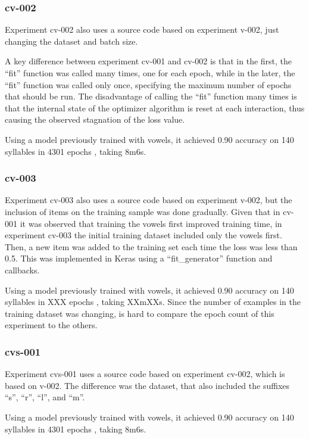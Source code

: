 \subsubsection{cv-002}
Experiment cv-002 also uses a source code based on experiment v-002, just changing the dataset and batch size.

A key difference between experiment cv-001 and cv-002 is that in the first, the ``fit'' function was called many times, one for each epoch, while in the later, the ``fit'' function was called only once, specifying the maximum number of epochs that should be run. The disadvantage of calling the ``fit'' function many times is that the internal state of the optimizer algorithm is reset at each interaction, thus causing the observed stagnation of the loss value.

Using a model previously trained with vowels, it achieved 0.90 accuracy on 140 syllables in 4301 epochs , taking 8m6s.

\subsubsection{cv-003}

Experiment cv-003 also uses a source code based on  experiment v-002, but the inclusion of items on the training sample was done gradually. Given that in cv-001 it was observed that training the vowels first improved training time, in experiment cv-003 the initial training dataset included only the vowels first. Then, a new item was added to the training set each time the loss was less than 0.5. This was implemented in Keras using a ``fit\_generator'' function and callbacks.

Using a model previously trained with vowels, it achieved 0.90 accuracy on 140 syllables in XXX epochs , taking XXmXXs. Since the number of examples in the training dataset was changing, is hard to compare the epoch count of this experiment to the others.


\subsubsection{cvs-001}

Experiment cvs-001 uses a source code based on experiment cv-002, which is based on v-002. The difference was the dataset, that also included the suffixes ``s'', ``r'', ``l'', and ``m''.

Using a model previously trained with vowels, it achieved 0.90 accuracy on 140 syllables in 4301 epochs , taking 8m6s.